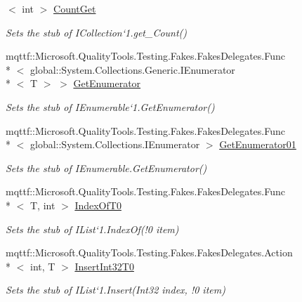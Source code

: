 \begin{DoxyCompactItemize}
$<$ int $>$ \hyperlink{class_system_1_1_collections_1_1_generic_1_1_fakes_1_1_stub_i_list_3_01_t_01_4_a2b08dfd442f20beda2b007876996ffc4}{Count\-Get}
\begin{DoxyCompactList}\small\item\em Sets the stub of I\-Collection`1.get\-\_\-\-Count()\end{DoxyCompactList}\item 
mqttf\-::\-Microsoft.\-Quality\-Tools.\-Testing.\-Fakes.\-Fakes\-Delegates.\-Func\\*
$<$ global\-::\-System.\-Collections.\-Generic.\-I\-Enumerator\\*
$<$ T $>$ $>$ \hyperlink{class_system_1_1_collections_1_1_generic_1_1_fakes_1_1_stub_i_list_3_01_t_01_4_a3bbfd4dd7d970a7f3493888e784c4f4f}{Get\-Enumerator}
\begin{DoxyCompactList}\small\item\em Sets the stub of I\-Enumerable`1.Get\-Enumerator()\end{DoxyCompactList}\item 
mqttf\-::\-Microsoft.\-Quality\-Tools.\-Testing.\-Fakes.\-Fakes\-Delegates.\-Func\\*
$<$ global\-::\-System.\-Collections.\-I\-Enumerator $>$ \hyperlink{class_system_1_1_collections_1_1_generic_1_1_fakes_1_1_stub_i_list_3_01_t_01_4_ae6f3edcfbbd96552c6beb0c690ae797e}{Get\-Enumerator01}
\begin{DoxyCompactList}\small\item\em Sets the stub of I\-Enumerable.\-Get\-Enumerator()\end{DoxyCompactList}\item 
mqttf\-::\-Microsoft.\-Quality\-Tools.\-Testing.\-Fakes.\-Fakes\-Delegates.\-Func\\*
$<$ T, int $>$ \hyperlink{class_system_1_1_collections_1_1_generic_1_1_fakes_1_1_stub_i_list_3_01_t_01_4_aaad26e8b56025f5036f278a6828ae911}{Index\-Of\-T0}
\begin{DoxyCompactList}\small\item\em Sets the stub of I\-List`1.Index\-Of(!0 item)\end{DoxyCompactList}\item 
mqttf\-::\-Microsoft.\-Quality\-Tools.\-Testing.\-Fakes.\-Fakes\-Delegates.\-Action\\*
$<$ int, T $>$ \hyperlink{class_system_1_1_collections_1_1_generic_1_1_fakes_1_1_stub_i_list_3_01_t_01_4_a52dbddc75092d3d64a0b739c5f9700d9}{Insert\-Int32\-T0}
\begin{DoxyCompactList}\small\item\em Sets the stub of I\-List`1.Insert(Int32 index, !0 item)\end{DoxyCompactList}\item 

\end{DoxyCompactItemize}
